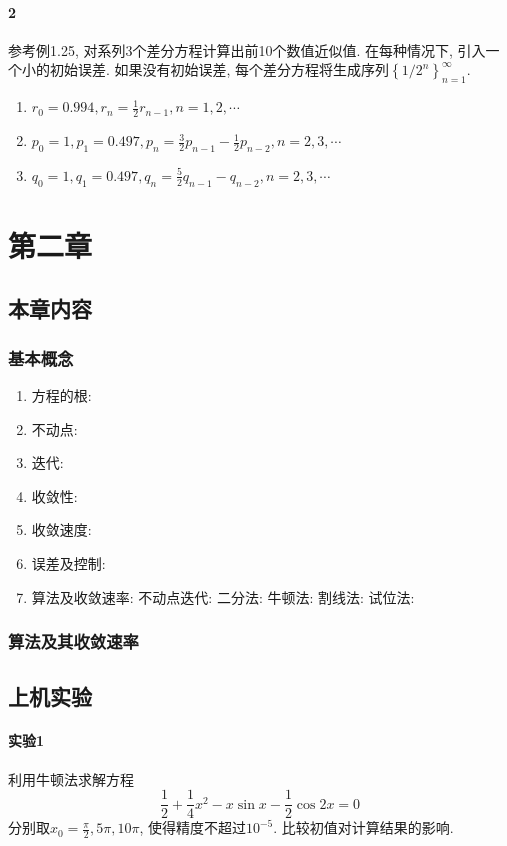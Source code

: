 \documentclass{ctexart}
\begin{document}
	\paragraph{2}
	参考例1.25, 对系列3个差分方程计算出前10个数值近似值. 在每种情况下, 引入一个小的初始误差. 如果没有初始误差, 每个差分方程将生成序列$\left\{ 1/2^n\right\}_{n=1}^{\infty}$.
	\begin{enumerate}
		\item $r_0=0.994,r_n=\frac{1}{2}r_{n-1},n=1,2,\cdots$
		\item $p_0=1,p_1=0.497,p_n=\frac{3}{2}p_{n-1}-\frac{1}{2}p_{n-2},n=2,3,\cdots$
		\item $q_0=1,q_1=0.497,q_n=\frac{5}{2}q_{n-1}-q_{n-2},n=2,3,\cdots$
	\end{enumerate}
\section{第二章}
\subsection{本章内容}
	\subsubsection{基本概念}
		\begin{enumerate}
			\item 方程的根: 
			\item 不动点: 
			\item 迭代: 
			\item 收敛性: 
			\item 收敛速度: 
			\item 误差及控制: 
			\item 算法及收敛速率:
				\subitem 不动点迭代:
				\subitem 二分法:
				\subitem 牛顿法: 
				\subitem 割线法:
				\subitem 试位法:
		\end{enumerate}
		
	\subsubsection{算法及其收敛速率}
\subsection{上机实验}
\paragraph{实验1}
	利用牛顿法求解方程
	\begin{equation}
		\frac{1}{2} + \frac{1}{4}x^2 - x\sin x - \frac{1}{2}\cos 2x = 0
	\end{equation}
	分别取$x_0 = \frac{\pi}{2}, 5\pi, 10\pi$, 使得精度不超过$10^{-5}$. 比较初值对计算结果的影响.
\end{document}
